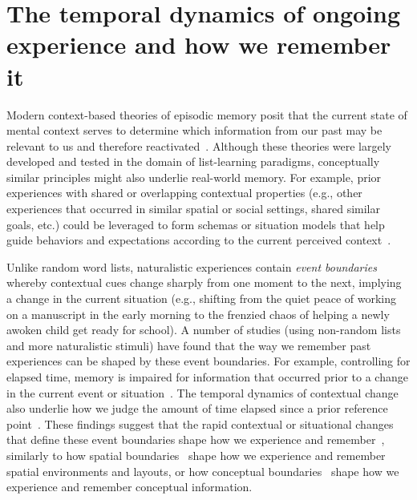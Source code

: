 \documentclass{article}
\begin{document}
\section*{The temporal dynamics of ongoing experience and how we remember it}
Modern context-based theories of episodic memory posit that the current state of mental context serves to determine which information from our past may be relevant to us and therefore reactivated~\citep[e.g., ][]{PolyEtal09}. Although these theories were largely developed and tested in the domain of list-learning paradigms, conceptually similar principles might also underlie real-world memory.  For example, prior experiences with shared or overlapping contextual properties (e.g., other experiences that occurred in similar spatial or social settings, shared similar goals, etc.) could be leveraged to form schemas or situation models that help guide behaviors and expectations according to the current perceived context~\citep{RangRitc12, BaldEtal18, AlyEtal18}.

Unlike random word lists, naturalistic experiences contain \textit{event boundaries} whereby contextual cues change sharply from one moment to the next, implying a change in the current situation (e.g., shifting from the quiet peace of working on a manuscript in the early morning to the frenzied chaos of helping a newly awoken child get ready for school).  A number of studies (using non-random lists and more naturalistic stimuli) have found that the way we remember past experiences can be shaped by these event boundaries.  For example, controlling for elapsed time, memory is impaired for information that occurred prior to a change in the current event or situation~\citep[e.g., ][]{RadvCope06, SwalEtal09, SwalEtal11, EzzyDava11, MannEtal16}.  The temporal dynamics of contextual change also underlie how we judge the amount of time elapsed since a prior reference point~\citep{BlocReed78, SahaSmit14}.  These findings suggest that the rapid contextual or situational changes that define these event boundaries shape how we experience and remember~\citep{DuBrDava16}, similarly to how spatial boundaries~\citep[e.g., environmental barriers;][]{McKeBuzs16, BrunEtal18} shape how we experience and remember spatial environments and layouts, or how conceptual boundaries~\citep[e.g., distinctions between semantic categories;][]{BrunEtal18} shape how we experience and remember conceptual information.
\end{document}
